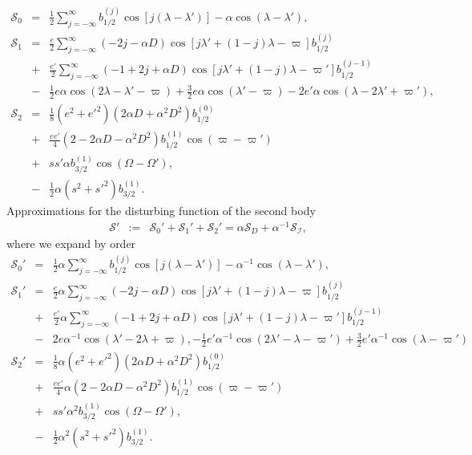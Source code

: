 \documentclass [12pt, a4paper] {article}
\begin{document}
\begin {eqnarray}
    \mathcal{S}_0
    &=&
    \frac{1}{2}\sum_{j=-\infty}^\infty 
    b_{1/2}^{(j)}
    \cos[j(\lambda - \lambda')]
    - 
    \alpha \cos(\lambda - \lambda'),
    \\
    \mathcal{S}_1
    &=&
    \frac{e}{2}\sum_{j=-\infty}^\infty 
    (-2j - \alpha D)
    \cos[j\lambda' + (1 - j)\lambda - \varpi]
    b_{1/2}^{(j)}
    \\\nonumber 
    &+&
    \frac{e'}{2}\sum_{j=-\infty}^\infty 
    (-1 +2j + \alpha D)
    \cos[j\lambda' + (1 - j)\lambda - \varpi']
    b_{1/2}^{(j-1)}
    \\\nonumber
    &-&
    \frac{1}{2}e\alpha \cos(2\lambda - \lambda' - \varpi)
    +
    \frac{3}{2}e\alpha \cos(\lambda' - \varpi)
    -
    2e'\alpha \cos(\lambda - 2\lambda' + \varpi'),
    \\
    \mathcal{S}_2
    &=&
    \frac{1}{8}(e^2 + e'^2)(2\alpha D + \alpha^2D^2)b_{1/2}^{(0)}
    \\\nonumber 
    &+&
    \frac{ee'}{4}(2 - 2\alpha D - \alpha^2D^2)b_{1/2}^{(1)}\cos(\varpi - \varpi')
    \\\nonumber 
    &+&
    ss'\alpha b_{3/2}^{(1)}\cos(\Omega - \Omega'),
    \\\nonumber 
    &-&
    \frac{1}{2}\alpha(s^2 + s'^2)b_{3/2}^{(1)}.
\end {eqnarray}
Approximations for the disturbing function of the second body
\begin {eqnarray}
    \mathcal{S'}
    &:=& 
    \mathcal{S}_0'
    +
    \mathcal{S}_1'
    +
    \mathcal{S}_2'
    =
    \alpha \mathcal{S}_D
    +
    \alpha^{-1}\mathcal{S_I},
\end {eqnarray}
where we expand by order
\begin {eqnarray}
    \mathcal{S}_0'
    &=&
    \frac{1}{2}\alpha\sum_{j=-\infty}^\infty 
    b_{1/2}^{(j)}
    \cos[j(\lambda - \lambda')]
    - 
    \alpha^{-1}\cos(\lambda - \lambda'),
    \\
    \mathcal{S}_1'
    &=&
    \frac{e}{2}\alpha\sum_{j=-\infty}^\infty 
    (-2j - \alpha D)
    \cos[j\lambda' + (1 - j)\lambda - \varpi]
    b_{1/2}^{(j)}
    \\\nonumber 
    &+&
    \frac{e'}{2}\alpha\sum_{j=-\infty}^\infty 
    (-1 +2j + \alpha D)
    \cos[j\lambda' + (1 - j)\lambda - \varpi']
    b_{1/2}^{(j-1)}
    \\\nonumber
    &-&
    2e\alpha^{-1} \cos(\lambda' - 2\lambda + \varpi),
    -
    \frac{1}{2}e'\alpha^{-1} \cos(2\lambda' - \lambda - \varpi')
    +
    \frac{3}{2}e'\alpha^{-1} \cos(\lambda - \varpi')
    \\
    \mathcal{S}_2'
    &=&
    \frac{1}{8}\alpha(e^2 + e'^2)(2\alpha D + \alpha^2D^2)b_{1/2}^{(0)}
    \\\nonumber 
    &+&
    \frac{ee'}{4}\alpha(2 - 2\alpha D - \alpha^2D^2)b_{1/2}^{(1)}\cos(\varpi - \varpi')
    \\\nonumber 
    &+&
    ss'\alpha^2 b_{3/2}^{(1)}\cos(\Omega - \Omega'),
    \\\nonumber 
    &-&
    \frac{1}{2}\alpha^2(s^2 + s'^2)b_{3/2}^{(1)}.
\end {eqnarray}
\end{document}
